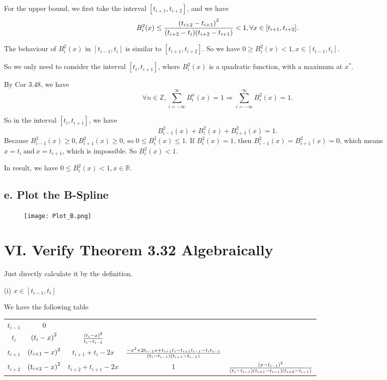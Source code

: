 \documentclass[a4paper]{article}
\begin{document}
For the upper bound, we first take the interval $[t_{i+1}, t_{i+2}]$, and we have
\begin{equation}
    B_i^2(x) \leq \frac{\qty(t_{i+2} - t_{i+1})^2}{\qty(t_{i+2} - t_{i}) \qty(t_{i+2} - t_{i+1})} < 1, \forall x \in [t_{i+1}, t_{i+2}].
\end{equation}

The behaviour of $B_i^2(x)$ in $[t_{i-1}, t_i]$ is similar to $[t_{i+1}, t_{i+2}]$. So we have $ 0 \geq B_i^2(x) < 1, x \in [t_{i-1}, t_{i}]$. 

So we only need to consider the interval $[t_i, t_{i+1}]$, where $B_i^2(x)$ is a quadratic function, with a maximum at $x^*$. 

By Cor 3.48, we have 
\begin{equation}
    \forall n \in \mathbb{Z}, \sum_{i=- \infty}^{\infty} B_i^n(x) = 1 \Rightarrow \sum_{i=-\infty}^{\infty} B_i^2(x) = 1.
\end{equation}

So in the interval $[t_i, t_{i+1}]$, we have
\begin{equation}
    B_{i-1}^2(x) + B_i^2(x) + B_{i+1}^2(x) = 1. 
\end{equation}
Because $B_{i-1}^2(x) \geq 0, B_{i+1}^2(x) \geq 0$, so $ 0 \leq B_i^2(x) \leq 1$. If $B_i^2(x) = 1$, then $B_{i-1}^2(x) = B_{i+1}^2(x) = 0$, which means $x = t_i ~\text{and}~ x =  t_{i+1}$, which is impossible. So $B_i^2(x) < 1$.

In result, we have $0 \leq B_i^2(x) < 1, x \in \mathbb{R}$.

\subsection*{e. Plot the B-Spline}
\begin{figure}[H]
    \centering
    \texttt{[image: Plot\_B.png]}
\end{figure}


\section*{VI. Verify Theorem 3.32 Algebraically}

Just directly calculate it by the definition. 

(i) $x \in [t_{i-1}, t_{i}]$

We have the following table
\begin{table}[H]
    \centering  
    \begin{tabular}{c|cccc}
    $t_{i-1}$  & 0 &    & \\
    $t_{i}$    & $\qty(t_i - x)^2$ & $\frac{\qty(t_i - x)^2}{t_{i} - t_{i-1}}$  & \\
    $t_{i+1}$  & $\qty(t_{i+1} - x)^2$ & $t_{i+1}+t_i - 2x$  & $\frac{-x^2+2t_{i-1}x+t_{i+1}t_i - t_{i+1}t_{i-1}-t_i t_{i-1}}{\qty(t_i-t_{i-1})\qty(t_{i+1}-t_{i-1})}$& \\
    $t_{i+2}$  & $\qty(t_{i+2} - x)^2$ & $t_{i+2}+t_{i+1} - 2x$  & 1 & $\frac{\qty(x-t_{i-1})^2}{\qty(t_i - t_{i-1})\qty(t_{i+1} - t_{i-1})\qty(t_{i+2} - t_{i-1})}$\\
    \end{tabular}
\end{table} 
\end{document}
